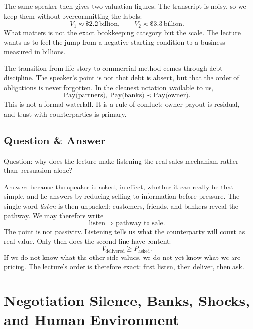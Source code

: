 The same speaker then gives two valuation figures. The transcript is noisy, so we keep them without overcommitting the labels:
\begin{equation}
V_1 \approx \$2.2\,\text{billion}, \qquad V_2 \approx \$3.3\,\text{billion}.
\end{equation}
What matters is not the exact bookkeeping category but the scale. The lecture wants us to feel the jump from a negative starting condition to a business measured in billions.

The transition from life story to commercial method comes through debt discipline. The speaker's point is not that debt is absent, but that the order of obligations is never forgotten. In the cleanest notation available to us,
\begin{equation}
\text{Pay(partners)},\ \text{Pay(banks)} \prec \text{Pay(owner)}.
\end{equation}
This is not a formal waterfall. It is a rule of conduct: owner payout is residual, and trust with counterparties is primary.

\subsection{Question \& Answer}

Question: why does the lecture make listening the real sales mechanism rather than persuasion alone?

Answer: because the speaker is asked, in effect, whether it can really be that simple, and he answers by reducing selling to information before pressure. The single word \emph{listen} is then unpacked: customers, friends, and bankers reveal the pathway. We may therefore write
\begin{equation}
\mathrm{listen} \Rightarrow \text{pathway to sale}.
\end{equation}
The point is not passivity. Listening tells us what the counterparty will count as real value. Only then does the second line have content:
\begin{equation}
V_{\text{delivered}} \ge P_{\text{asked}}.
\end{equation}
If we do not know what the other side values, we do not yet know what we are pricing. The lecture's order is therefore exact: first listen, then deliver, then ask.

\section{Negotiation Silence, Banks, Shocks, and Human Environment}


